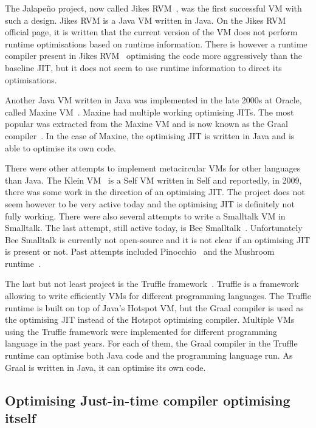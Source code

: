 \documentclass[a4paper,12pt,twoside]{../includes/ThesisStyle}
\begin{document}
The Jalape\~no project, now called Jikes RVM~\cite{Alp99a}, was the first successful VM with such a design. Jikes RVM is a Java VM written in Java. On the Jikes RVM official page, it is written that the current version of the VM does not perform runtime optimisations based on runtime information. There is however a runtime compiler present in Jikes RVM~\cite{Arn00} optimising the code more aggressively than the baseline JIT, but it does not seem to use runtime information to direct its optimisations. 


Another Java VM written in Java was implemented in the late 2000s at Oracle, called Maxine VM~\cite{Wimm13a}. Maxine had multiple working optimising JITs. The most popular was extracted from the Maxine VM and is now known as the Graal compiler~\cite{Oracle13,Dubo13c}. In the case of Maxine, the optimising JIT is written in Java and is able to optimise its own code.

There were other attempts to implement metacircular VMs for other languages than Java. The Klein VM~\cite{Unga05b} is a Self VM written in Self and reportedly, in 2009, there was some work in the direction of an optimising JIT. The project does not seem however to be very active today and the optimising JIT is definitely not fully working. There were also several attempts to write a Smalltalk VM in Smalltalk. The last attempt, still active today, is Bee Smalltalk~\cite{Pim14a}. Unfortunately Bee Smalltalk is currently not open-source and it is not clear if an optimising JIT is present or not. Past attempts included Pinocchio~\cite{Verw10d} and the Mushroom runtime~\cite{MushroomST}.

The last but not least project is the Truffle framework~\cite{Wur13a}. Truffle is a framework allowing to write efficiently VMs for different programming languages. The Truffle runtime is built on top of Java's Hotspot VM, but the Graal compiler is used as the optimising JIT instead of the Hotspot optimising compiler. 
Multiple VMs using the Truffle framework were implemented for different programming language in the past years. For each of them, the Graal compiler in the Truffle runtime can optimise both Java code and the programming language run. As Graal is written in Java, it can optimise its own code.

\subsection{Optimising Just-in-time compiler optimising itself}
\end{document}
